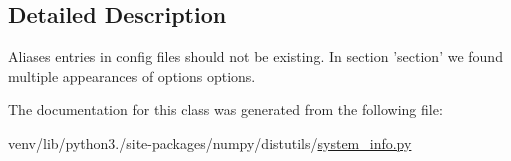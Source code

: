 \subsection{Detailed Description}
\begin{DoxyVerb}Aliases entries in config files should not be existing.
In section '{section}' we found multiple appearances of options {options}.\end{DoxyVerb}
 

The documentation for this class was generated from the following file\+:\begin{DoxyCompactItemize}
\item 
venv/lib/python3./site-\/packages/numpy/distutils/\hyperlink{system__info_8py}{system\+\_\+info.\+py}\end{DoxyCompactItemize}
